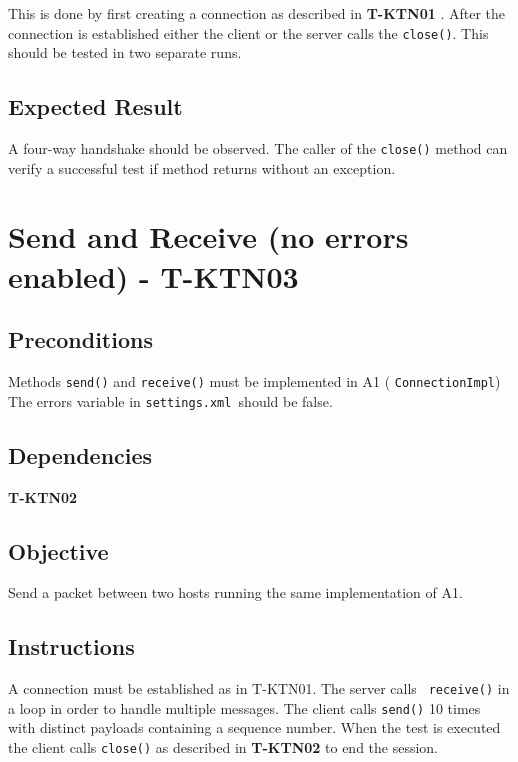 \documentclass{article}
\begin{document}
This is done by first creating a connection as described in \textbf{T-KTN01}%
. After the connection is established either the client or the server calls
the \texttt{close()}. This should be tested in two separate runs.

\subsection{Expected Result}

A four-way handshake should be observed. The caller of the \texttt{close()}
method can verify a successful test if method returns without an exception.

\section{Send and Receive (no errors enabled) - T-KTN03}

\subsection{Preconditions}

Methods \texttt{send()} and \texttt{receive()} must be implemented in A1 (%
\texttt{ConnectionImpl}) The errors variable in \texttt{settings.xml }should
be false.

\subsection{Dependencies}

\textbf{T-KTN02}

\subsection{Objective}

Send a packet between two hosts running the same implementation of A1.

\subsection{Instructions}

A connection must be established as in T-KTN01. The server calls \texttt{%
receive()} in a loop in order to handle multiple messages. The client calls 
\texttt{send()} 10 times with distinct payloads containing a sequence
number. When the test is executed the client calls \texttt{close()} as
described in \textbf{T-KTN02} to end the session.
\end{document}

